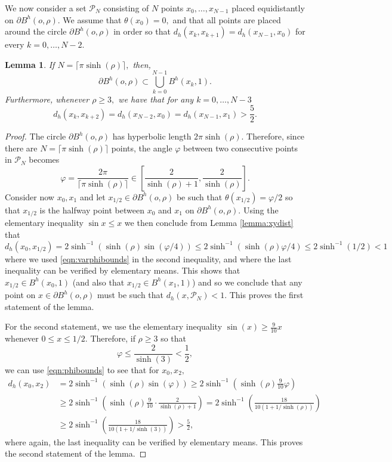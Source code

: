 \documentclass[a4paper,12pt]{article}
\newcommand{\CP}{{\mathcal{P}}}
\newtheorem{lemma}[theorem]{Lemma}
\begin{document}
We now consider a set $\CP_N$ consisting of $N$ points $x_0,\ldots, x_{N-1}$
placed equidistantly on $\partial B^h(o,\rho).$ We assume that $\theta(x_0)=0,$
and that all points are placed around the circle $\partial B^h(o,\rho)$ in order
so that $d_h(x_k,x_{k+1})=d_h(x_{N-1},x_0)$ for every $k=0,\ldots,N-2.$ 
\begin{lemma} \label{lemma:ballsoncircle}
If $N=\lceil \pi \sinh(\rho) \rceil,$ then, 
\[
\partial B^h(o,\rho) \subset \bigcup_{k=0}^{N-1} B^h(x_k,1). 
\]
Furthermore, whenever $\rho \geq 3,$ we have that for any $k=0,\ldots,N-3$
\begin{equation} \label{eqn:pointsoncircledist}
  d_h(x_k,x_{k+2})=d_h(x_{N-2},x_0)=d_h(x_{N-1},x_1) >\frac{5}{2}.   
\end{equation}
\end{lemma}
\begin{proof}
The circle $\partial B^h(o,\rho)$ has hyperbolic length
$2 \pi \sinh(\rho).$ Therefore, since there are $N=\lceil \pi \sinh(\rho) \rceil$ points, 
the angle $\varphi$ between two consecutive points in $\CP_N$ becomes 
\begin{equation} \label{eqn:varphibounds}
 \varphi=\frac{2 \pi}{\lceil \pi \sinh(\rho) \rceil}
\in \left[ \frac{2}{\sinh(\rho)+1},\frac{2}{\sinh(\rho)}\right].   
\end{equation}
Consider now $x_0,x_1$ and let $x_{1/2} \in \partial B^h(o,\rho)$ be such that 
$\theta(x_{1/2})=\varphi/2$
so that $x_{1/2}$ is the halfway point between $x_0$ and $x_1$ on $\partial B^h(o,\rho).$ 
Using the elementary inequality $\sin x \leq x$ we then conclude from Lemma \ref{lemma:xydist}
that 
\begin{equation} \label{eqn:phibounds}
   d_h(x_0,x_{1/2}) =2\sinh^{-1}\left(\sinh(\rho) \sin(\varphi/4)\right)
\leq 2\sinh^{-1}\left(\sinh(\rho) \varphi/4\right)  
\leq 2\sinh^{-1}\left(1/2\right)<1  
\end{equation}
where we used \eqref{eqn:varphibounds} in the second inequality, and where
the last inequality can be verified by elementary means. This shows that 
$x_{1/2}\in B^h(x_0,1)$ (and also that $x_{1/2}\in B^h(x_1,1)$) and so we conclude that 
any point on $x\in \partial B^h(o,\rho)$ must be such that $d_h(x,\CP_N)<1.$ This 
proves the first statement of the lemma.

For the second statement, we use the elementary inequality $\sin(x)\geq \frac{9}{10}x$ whenever 
$0\leq x\leq 1/2.$ Therefore, if $\rho \geq 3$ so that 
\[
\varphi\leq \frac{2}{\sinh(3)}<\frac{1}{2},
\]
we can use \eqref{eqn:phibounds} to see that for $x_0,x_{2},$ 
\begin{align*}
d_h(x_0,x_{2}) & =2\sinh^{-1}\left(\sinh(\rho) \sin(\varphi)\right)
\geq 2\sinh^{-1}\left(\sinh(\rho) \frac{9}{10} \varphi \right) \\
& \geq 2\sinh^{-1}\left(\sinh(\rho) \frac{9}{10} \cdot \frac{2}{\sinh(\rho)+1}\right) 
=2\sinh^{-1}\left(\frac{18}{10(1+1/\sinh(\rho))}\right) \\
& \geq 2\sinh^{-1}\left(\frac{18}{10(1+1/\sinh(3))}\right)>\frac{5}{2},
\end{align*}
where again, the last inequality can be verified by elementary means.
This proves the second statement of the lemma.
\end{proof}
\end{document}
